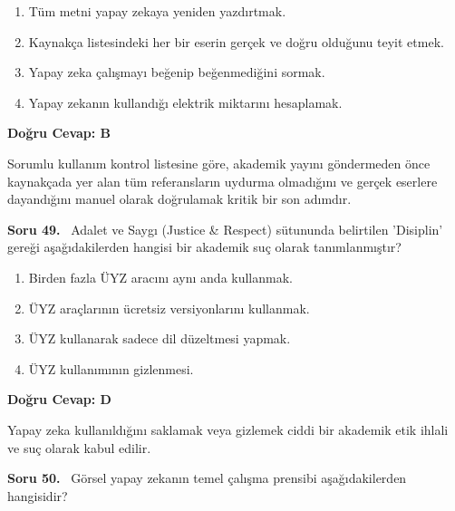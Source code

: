 \documentclass[11pt,a4paper,openany]{book}
\begin{document}
\begin{enumerate}[label=\Alph*), leftmargin=25pt, topsep=4pt, itemsep=2pt]
        \item Tüm metni yapay zekaya yeniden yazdırtmak.
        \item Kaynakça listesindeki her bir eserin gerçek ve doğru olduğunu teyit etmek.
        \item Yapay zeka çalışmayı beğenip beğenmediğini sormak.
        \item Yapay zekanın kullandığı elektrik miktarını hesaplamak.
\end{enumerate}

\vspace{4pt}
\begin{tcolorbox}[title=Cevap ve Açıklama, colback=gray!3!white, colframe=primarycolor!90!black, arc=2mm, fonttitle=\bfseries\sffamily, top=6pt, bottom=6pt]
    \textbf{Doğru Cevap: B}

    \vspace{2pt}
    Sorumlu kullanım kontrol listesine göre, akademik yayını göndermeden önce kaynakçada yer alan tüm referansların uydurma olmadığını ve gerçek eserlere dayandığını manuel olarak doğrulamak kritik bir son adımdır.
\end{tcolorbox}
\vspace{10pt}
\needspace{5cm}
\vspace{8pt}
\noindent\textbf{\large\sffamily Soru 49.} \ Adalet ve Saygı (Justice & Respect) sütununda belirtilen 'Disiplin' gereği aşağıdakilerden hangisi bir akademik suç olarak tanımlanmıştır?

\begin{enumerate}[label=\Alph*), leftmargin=25pt, topsep=4pt, itemsep=2pt]
        \item Birden fazla ÜYZ aracını aynı anda kullanmak.
        \item ÜYZ araçlarının ücretsiz versiyonlarını kullanmak.
        \item ÜYZ kullanarak sadece dil düzeltmesi yapmak.
        \item ÜYZ kullanımının gizlenmesi.
\end{enumerate}

\vspace{4pt}
\begin{tcolorbox}[title=Cevap ve Açıklama, colback=gray!3!white, colframe=primarycolor!90!black, arc=2mm, fonttitle=\bfseries\sffamily, top=6pt, bottom=6pt]
    \textbf{Doğru Cevap: D}

    \vspace{2pt}
    Yapay zeka kullanıldığını saklamak veya gizlemek ciddi bir akademik etik ihlali ve suç olarak kabul edilir.
\end{tcolorbox}
\vspace{10pt}
\needspace{5cm}
\vspace{8pt}
\noindent\textbf{\large\sffamily Soru 50.} \ Görsel yapay zekanın temel çalışma prensibi aşağıdakilerden hangisidir?
\end{document}
